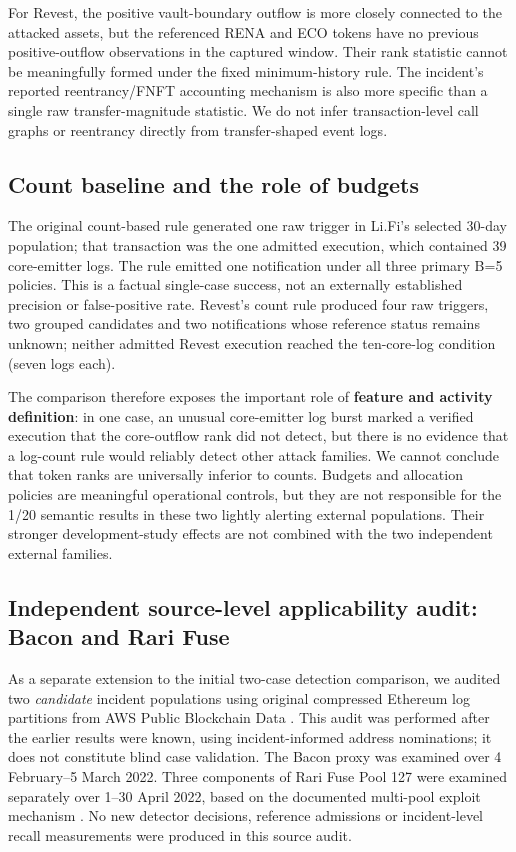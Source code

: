 \documentclass[preprint,12pt,authoryear]{elsarticle}
\begin{document}
For Revest, the positive vault-boundary outflow is more closely connected to the attacked assets, but the referenced RENA and ECO tokens have no previous positive-outflow observations in the captured window. Their rank statistic cannot be meaningfully formed under the fixed minimum-history rule. The incident's reported reentrancy/FNFT accounting mechanism is also more specific than a single raw transfer-magnitude statistic. We do not infer transaction-level call graphs or reentrancy directly from transfer-shaped event logs.

\subsection{Count baseline and the role of budgets}\label{count-baseline-and-the-role-of-budgets}

The original count-based rule generated one raw trigger in Li.Fi's selected 30-day population; that transaction was the one admitted execution, which contained 39 core-emitter logs. The rule emitted one notification under all three primary B=5 policies. This is a factual single-case success, not an externally established precision or false-positive rate. Revest's count rule produced four raw triggers, two grouped candidates and two notifications whose reference status remains unknown; neither admitted Revest execution reached the ten-core-log condition (seven logs each).

The comparison therefore exposes the important role of \textbf{feature and activity definition}: in one case, an unusual core-emitter log burst marked a verified execution that the core-outflow rank did not detect, but there is no evidence that a log-count rule would reliably detect other attack families. We cannot conclude that token ranks are universally inferior to counts. Budgets and allocation policies are meaningful operational controls, but they are not responsible for the 1/20 semantic results in these two lightly alerting external populations. Their stronger development-study effects are not combined with the two independent external families.

\subsection{Independent source-level applicability audit: Bacon and Rari Fuse}\label{independent-source-level-applicability-audit-bacon-and-rari-fuse}

As a separate extension to the initial two-case detection comparison, we audited two \emph{candidate} incident populations using original compressed Ethereum log partitions from AWS Public Blockchain Data \citep{AWS2026Dataset}. This audit was performed after the earlier results were known, using incident-informed address nominations; it does not constitute blind case validation. The Bacon proxy \citep{Certik2022Bacon} was examined over 4 February--5 March 2022. Three components of Rari Fuse Pool 127 were examined separately over 1--30 April 2022, based on the documented multi-pool exploit mechanism \citep{Rari2022Postmortem}. No new detector decisions, reference admissions or incident-level recall measurements were produced in this source audit.
\end{document}
